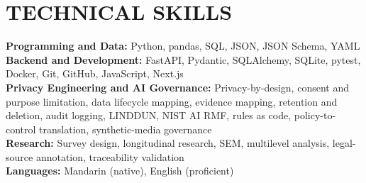 \documentclass[10pt]{article}
\begin{document}
\section*{TECHNICAL SKILLS}
\textbf{Programming and Data:} Python, pandas, SQL, JSON, JSON Schema, YAML\\
\textbf{Backend and Development:} FastAPI, Pydantic, SQLAlchemy, SQLite, pytest, Docker, Git, GitHub, JavaScript, Next.js\\
\textbf{Privacy Engineering and AI Governance:} Privacy-by-design, consent and purpose limitation, data lifecycle mapping, evidence mapping, retention and deletion, audit logging, LINDDUN, NIST AI RMF, rules as code, policy-to-control translation, synthetic-media governance\\
\textbf{Research:} Survey design, longitudinal research, SEM, multilevel analysis, legal-source annotation, traceability validation\\
\textbf{Languages:} Mandarin (native), English (proficient)
\end{document}

